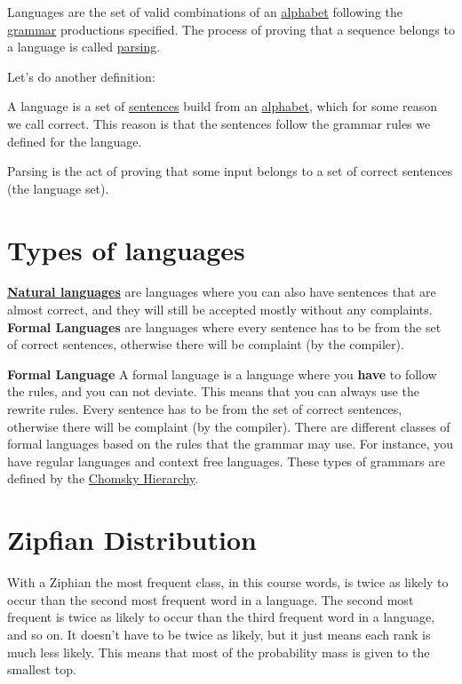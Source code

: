 \documentclass[
  11pt,
  british,
]{article}
\begin{document}
Languages are the set of valid combinations of an
\href{Alphabet.md}{alphabet} following the \href{Grammar.md}{grammar}
productions specified. The process of proving that a sequence belongs to
a language is called \href{Parsing.md}{parsing}.

Let's do another definition:

A language is a set of \href{../Data/Sentences.md}{sentences} build from
an \href{Alphabet.md}{alphabet}, which for some reason we call correct.
This reason is that the sentences follow the grammar rules we defined
for the language.

Parsing is the act of proving that some input belongs to a set of
correct sentences (the language set).

\hypertarget{types-of-languages}{%
\section{Types of languages}\label{types-of-languages}}

\textbf{\href{Natural\%20languages.md}{Natural languages}} are languages
where you can also have sentences that are almost correct, and they will
still be accepted mostly without any complaints. \textbf{Formal
Languages} are languages where every sentence has to be from the set of
correct sentences, otherwise there will be complaint (by the compiler).

\textbf{Formal Language} A formal language is a language where you
\textbf{have} to follow the rules, and you can not deviate. This means
that you can always use the rewrite rules. Every sentence has to be from
the set of correct sentences, otherwise there will be complaint (by the
compiler). There are different classes of formal languages based on the
rules that the grammar may use. For instance, you have regular languages
and context free languages. These types of grammars are defined by the
\href{Chomsky\%20\%20Hierarchy.md}{Chomsky Hierarchy}.

\hypertarget{zipfian-distribution}{%
\section{Zipfian Distribution}\label{zipfian-distribution}}

With a Ziphian the most frequent class, in this course words, is twice
as likely to occur than the second most frequent word in a language. The
second most frequent is twice as likely to occur than the third frequent
word in a language, and so on. It doesn't have to be twice as likely,
but it just means each rank is much less likely. This means that most of
the probability mass is given to the smallest top.
\end{document}
